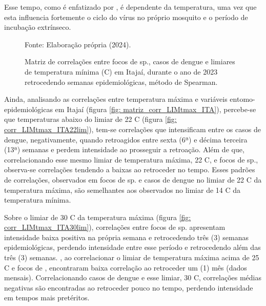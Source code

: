 \indent Esse tempo, como é enfatizado por , é dependente da temperatura, uma vez que esta influencia fortemente o ciclo do vírus no próprio mosquito e o período de incubação extrínseco. 

\begin{figure}[htbp]
    \begin{center}
    \caption{Matriz de correlações entre focos de  sp., casos de dengue e limiares de temperatura mínima (C) em Itajaí, durante o ano de 2023 retrocedendo semanas epidemiológicas, método de Spearman.}
    \label{fig: matriz_corr_LIMtmin_ITA}
        \hfill
    \end{center}
    \small{Fonte: Elaboração própria (2024).}
\end{figure}

\indent Ainda, analisando as correlações entre temperatura máxima e variáveis entomo-epidemiológicas em Itajaí (figura \ref{fig: matriz_corr_LIMtmax_ITA}), percebe-se que temperaturas abaixo do limiar de 22 C (figura \ref{fig: corr_LIMtmax_ITA22lim}), tem-se correlações que intensificam entre os casos de dengue, negativamente, quando retroagidos entre sexta (6ª) e décima terceira (13ª) semanas e perdem intensidade ao prosseguir a retroação. Além de que, correlacionando esse mesmo limiar de temperatura máxima, 22 C, e focos de  sp., observa-se correlações tendendo a baixas ao retroceder no tempo. Esses padrões de correlações, observados em focos de  sp. e casos de dengue no limiar de 22 C da temperatura máxima, são semelhantes aos observados no limiar de 14 C da temperatura mínima.

\indent Sobre o limiar de 30 C da temperatura máxima (figura \ref{fig: corr_LIMtmax_ITA30lim}), correlações entre focos de  sp. apresentam intensidade baixa positiva na própria semana e retrocedendo três (3) semanas epidemiológicas, perdendo intensidade entre esse período e retrocedendo além das três (3) semanas. , ao correlacionar o limiar de temperatura máxima acima de 25 C e focos de , encontraram baixa correlação ao retroceder um (1) mês (dados mensais). Correlacionando casos de dengue e esse limiar, 30 C, correlações médias negativas são encontradas ao retroceder pouco no tempo, perdendo intensidade em tempos mais pretéritos.


